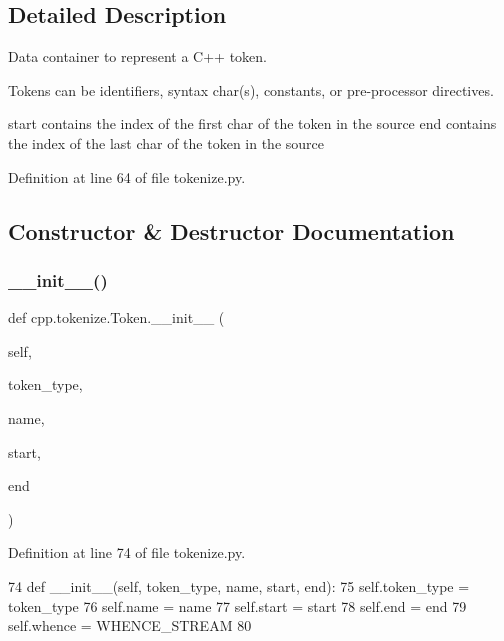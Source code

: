 \subsection{Detailed Description}
\begin{DoxyVerb}Data container to represent a C++ token.

Tokens can be identifiers, syntax char(s), constants, or
pre-processor directives.

start contains the index of the first char of the token in the source
end contains the index of the last char of the token in the source
\end{DoxyVerb}
 

Definition at line 64 of file tokenize.\+py.



\subsection{Constructor \& Destructor Documentation}
\mbox{\label{classcpp_1_1tokenize_1_1Token_a7da7659a5a6c61d0f4b8590cf96e19fd}} 
\subsubsection{\texorpdfstring{\+\_\+\+\_\+init\+\_\+\+\_\+()}{\_\_init\_\_()}}
{\footnotesize\ttfamily def cpp.\+tokenize.\+Token.\+\_\+\+\_\+init\+\_\+\+\_\+ (\begin{DoxyParamCaption}\item[{}]{self,  }\item[{}]{token\+\_\+type,  }\item[{}]{name,  }\item[{}]{start,  }\item[{}]{end }\end{DoxyParamCaption})}



Definition at line 74 of file tokenize.\+py.


\begin{DoxyCode}
74     \textcolor{keyword}{def }\_\_init\_\_(self, token\_type, name, start, end):
75         self.token\_type = token\_type
76         self.name = name
77         self.start = start
78         self.end = end
79         self.whence = WHENCE\_STREAM
80 
\end{DoxyCode}


